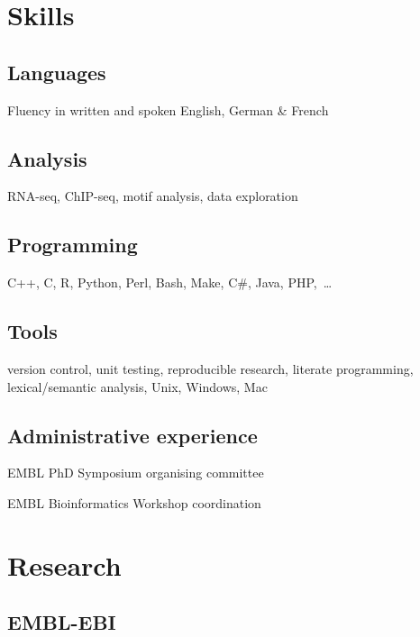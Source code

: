 \documentclass{klmr-cv}
\newcommand*\csharp{C\#}
\newcommand*\cpp{C++}
\begin{document}
\section{Skills}

\subsection{Languages}

\item{Fluency in written and spoken English, German \& French}

\subsection{Analysis}

\item{RNA-seq, ChIP-seq, motif analysis, data exploration}

\subsection{Programming}

\item{\cpp, C, R, Python, Perl, Bash, Make, \csharp, Java, PHP,~…}

\subsection{Tools}

\item{version control, unit testing, reproducible research, literate
    programming, lexical/semantic analysis, Unix, Windows, Mac}

\subsection{Administrative experience}

\item{EMBL PhD Symposium organising committee}
\item{EMBL Bioinformatics Workshop coordination}

\body

\section{Research}

\subsection{EMBL-EBI}
\end{document}
